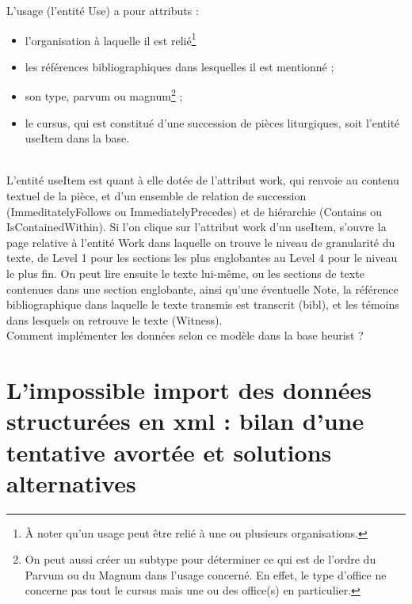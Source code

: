 \documentclass[a4paper,12pt,twoside]{book}
\begin{document}
    L'usage (l'entité \og Use\fg{}) a pour attributs :
    \begin{itemize}
        \item l'organisation à laquelle il est relié\footnote{À noter qu'un usage peut être relié à une ou plusieurs organisations.}
        \item les références bibliographiques dans lesquelles il est mentionné ;
        \item son type, \og parvum\fg{} ou \og magnum\fg{}\footnote{On peut aussi créer un \og subtype\fg{} pour déterminer ce qui est de l’ordre du \og Parvum\fg{} ou du \og Magnum\fg{} dans l’usage concerné. En effet, le type d’office ne concerne pas tout le cursus mais une ou des office(s) en particulier.} ;
        \item le cursus, qui est constitué d'une succession de pièces liturgiques, soit l'entité \og useItem\fg{} dans la base.
    \end{itemize}\\
    
    L'entité \og useItem\fg{} est quant à elle dotée de l'attribut \og work\fg{}, qui renvoie au contenu textuel de la pièce, et d'un ensemble de relation de succession (\og ImmeditatelyFollows\fg{} ou \og ImmediatelyPrecedes\fg{}) et de hiérarchie (\og Contains\fg{} ou \og IsContainedWithin\fg{}). Si l'on clique sur l'attribut \og work\fg{} d'un \og useItem\fg{}, s'ouvre la page relative à l'entité \og Work\fg{} dans laquelle on trouve le niveau de granularité du texte, de \og Level 1\fg{} pour les sections les plus englobantes au \og Level 4\fg{} pour le niveau le plus fin. On peut lire ensuite le texte lui-même, ou les sections de texte contenues dans une section englobante, ainsi qu'une éventuelle \og Note\fg{}, la référence bibliographique dans laquelle le texte transmis est transcrit (\og bibl\fg{}), et les témoins dans lesquels on retrouve le texte (\og Witness\fg{}). \\
    
    Comment implémenter les données selon ce modèle dans la base heurist ?
    
    
	\section{L’impossible import des données structurées en xml : bilan d’une tentative avortée et solutions alternatives}
	
\end{document}
